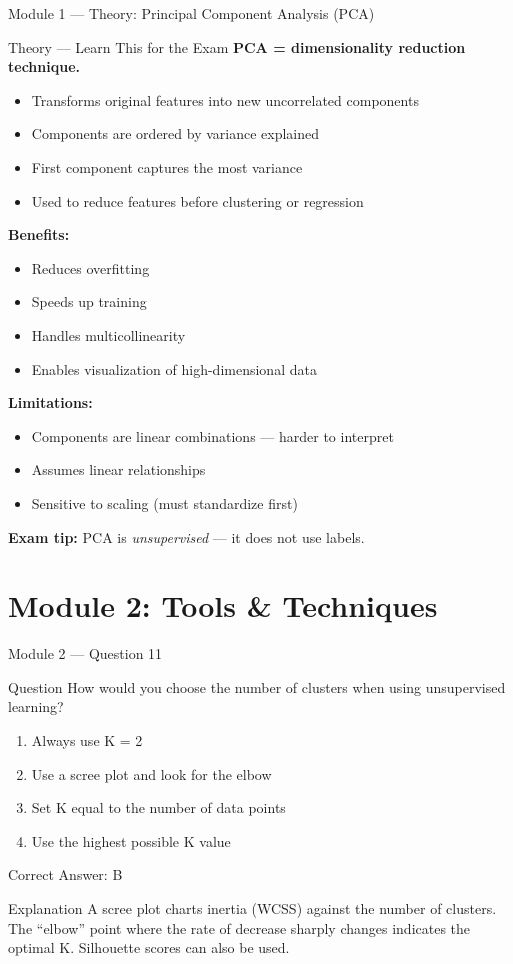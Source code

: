 \documentclass[aspectratio=169,10pt]{beamer}
\newcommand{\question}[1]{%
	\begin{block}{Question}
		#1
	\end{block}
}
\newcommand{\options}[4]{%
	\begin{enumerate}[label=\Alph*.,leftmargin=*]
		\item #1
		\item #2
		\item #3
		\item #4
	\end{enumerate}
}
\newcommand{\answerbox}[1]{%
	\begin{exampleblock}{Correct Answer: #1}
	\end{exampleblock}
}
\newcommand{\explain}[1]{%
	\begin{block}{Explanation}
		\small #1
	\end{block}
}
\newcommand{\theory}[1]{%
	\begin{block}{Theory --- Learn This for the Exam}
		\small #1
	\end{block}
}
\begin{document}
	\begin{frame}{Module 1 --- Theory: Principal Component Analysis (PCA)}
		\theory{
			\textbf{PCA = dimensionality reduction technique.}
			\begin{itemize}
				\item Transforms original features into new uncorrelated components
				\item Components are ordered by variance explained
				\item First component captures the most variance
				\item Used to reduce features before clustering or regression
			\end{itemize}
			\textbf{Benefits:}
			\begin{itemize}
				\item Reduces overfitting
				\item Speeds up training
				\item Handles multicollinearity
				\item Enables visualization of high-dimensional data
			\end{itemize}
			\textbf{Limitations:}
			\begin{itemize}
				\item Components are linear combinations --- harder to interpret
				\item Assumes linear relationships
				\item Sensitive to scaling (must standardize first)
			\end{itemize}
			\textbf{Exam tip:} PCA is \emph{unsupervised} --- it does not use labels.
		}
	\end{frame}
	
	\section{Module 2: Tools \& Techniques}
	
	\begin{frame}{Module 2 --- Question 11}
		\question{How would you choose the number of clusters when using unsupervised learning?}
		\options{Always use K = 2}{Use a scree plot and look for the elbow}{Set K equal to the number of data points}{Use the highest possible K value}
		\answerbox{B}
		\explain{A scree plot charts inertia (WCSS) against the number of clusters. The ``elbow'' point where the rate of decrease sharply changes indicates the optimal K. Silhouette scores can also be used.}
	\end{frame}
	
\end{document}
